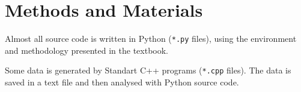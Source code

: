 
\section*{Methods and Materials}

Almost all source code is written in Python (\texttt{*.py} files), using the environment
and methodology presented in the textbook.

\vspace{5mm}
Some data is generated by Standart C++ programs (\texttt{*.cpp} files). The data is
saved in a text file and then analysed with Python source code.
